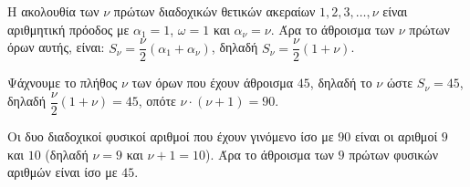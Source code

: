
\begin{alist}
\item Η ακολουθία των $\nu$ πρώτων διαδοχικών θετικών ακεραίων $1, 2, 3, \dots, \nu$ είναι αριθμητική πρόοδος με $\alpha_1 = 1$, $\omega = 1$ και $\alpha_\nu = \nu$. Άρα το άθροισμα των $\nu$ πρώτων όρων αυτής, είναι:
$S_\nu = \dfrac{\nu}{2}(\alpha_1 + \alpha_\nu)$, δηλαδή $S_\nu = \dfrac{\nu}{2}(1 + \nu)$.

\item Ψάχνουμε το πλήθος $\nu$ των όρων που έχουν άθροισμα $45$, δηλαδή το $\nu$ ώστε $S_\nu = 45$, δηλαδή
$\dfrac{\nu}{2}(1 + \nu) = 45$, οπότε $\nu \cdot (\nu + 1) = 90$.

Οι δυο διαδοχικοί φυσικοί αριθμοί που έχουν γινόμενο ίσο με $90$ είναι οι αριθμοί $9$ και $10$ (δηλαδή $\nu = 9$ και $\nu + 1 = 10$). Άρα το άθροισμα των $9$ πρώτων φυσικών αριθμών είναι ίσο με $45$.
\end{alist}

